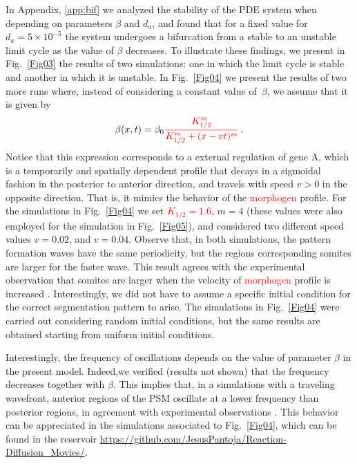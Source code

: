 \documentclass[%
 preprint,
 aip, 
 amsmath,amssymb,
]{revtex4-2}
\begin{document}
	In Appendix, \ref{app:bif} we analyzed the stability of the PDE system when 
	depending on parameters $\beta$ and $d_a$, and found that for a fixed value 
	for $d_a=5\times10^{-5}$ the system undergoes a bifurcation	from a stable to 
	an unstable limit cycle as the value of $\beta$ decreases. To illustrate these 
	findings, we present in Fig.~\ref{Fig03} the results of two
	simulations: one in which the limit cycle is stable and another in which it is
	unstable. In Fig.~\ref{Fig04} we present the results of two more runs where,
	instead of considering a constant value of~$\beta$, we assume that it is given
	by 
	\begin{gather}\label{eqbeta}
	\beta(x, t) = \beta_0 \textcolor{red}{\frac{K_{1/2}^m}{K_{1/2}^m + (x - v t)^m}}\,.
	\end{gather}
	Notice that this expression corresponds to a external regulation of gene A, which 
	is a temporarily and spatially dependent profile that decays in a sigmoidal 
	fashion in the posterior to anterior direction, and travels with speed
	$v>0$ in the opposite direction. That is, it mimics the behavior of the \textcolor{red}{morphogen}
	profile. For the simulations in Fig.~\ref{Fig04} we set \textcolor{red}{$K_{1/2} =1.6 $}, $m = 4 $
	(these values were also employed for the simulation in Fig.~\ref{Fig05}), and
	considered two different speed values $v = 0.02 $, and $v = 0.04$. Observe that, in
	both simulations, the pattern formation waves have the same periodicity, but the
	regions corresponding somites are larger for the faster wave. This result agrees
	with the experimental observation that somites are	larger when the velocity of 
	\textcolor{red}{morphogen} profile is increased \cite{Sawada2001}. Interestingly, we did not have to 
	assume a specific initial condition for the correct segmentation pattern to arise.
	The simulations in Fig.~\ref{Fig04} were carried out considering random initial 
	conditions, but the same results are obtained starting from uniform initial 
	conditions. 
	
	Interestingly, the frequency of oscillations depends on the value of parameter 
	$\beta$ in the present model. Indeed,we verified (results not shown) that 
	the frequency decreases together with $\beta$. This implies that, in a simulations 
	with a traveling wavefront, anterior regions of the PSM oscillate at a lower 
	frequency than posterior regions, in agreement with experimental observations 
	\cite{Goldbeter2008, Hester2011}. This behavior can be appreciated in the 
	simulations associated to Fig.~\ref{Fig04}, which can be found in the reservoir 
	\url{https://github.com/JesusPantoja/Reaction-Diffusion_Movies/}.
	
\end{document}

